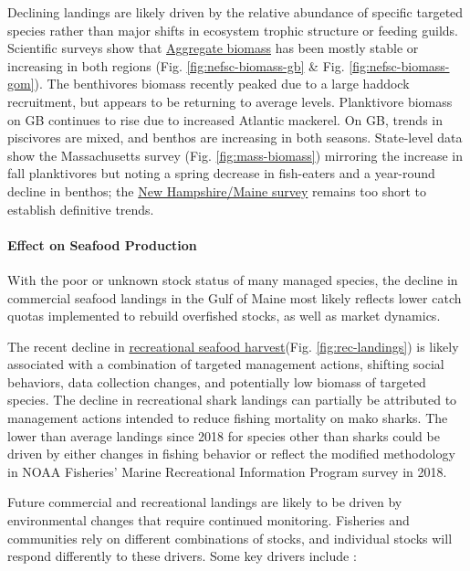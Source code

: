 \documentclass[
  10pt,
]{article}
\begin{document}
Declining landings are likely driven by the relative abundance of specific targeted species rather than major shifts in ecosystem trophic structure or feeding guilds. Scientific surveys show that \href{https://noaa-edab.github.io/catalog/aggregate_biomass.html}{Aggregate biomass} has been mostly stable or increasing in both regions (Fig. \ref{fig:nefsc-biomass-gb} \& Fig. \ref{fig:nefsc-biomass-gom}). The benthivores biomass recently peaked due to a large haddock recruitment, but appears to be returning to average levels. Planktivore biomass on GB continues to rise due to increased Atlantic mackerel. On GB, trends in piscivores are mixed, and benthos are increasing in both seasons. State-level data show the Massachusetts survey (Fig. \ref{fig:mass-biomass}) mirroring the increase in fall planktivores but noting a spring decrease in fish-eaters and a year-round decline in benthos; the \href{https://noaa-edab.github.io/catalog/mass_inshore_survey.html?q=survey\#mass_inshore_survey}{New Hampshire/Maine survey} remains too short to establish definitive trends.

\paragraph{Effect on Seafood Production}\label{effect-on-seafood-production}

With the poor or unknown stock status of many managed species, the decline in commercial seafood landings in the Gulf of Maine most likely reflects lower catch quotas implemented to rebuild overfished stocks, as well as market dynamics.

The recent decline in \href{https://noaa-edab.github.io/catalog/recdat.html}{recreational seafood harvest}(Fig. \ref{fig:rec-landings}) is likely associated with a combination of targeted management actions, shifting social behaviors, data collection changes, and potentially low biomass of targeted species. The decline in recreational shark landings can partially be attributed to management actions intended to reduce fishing mortality on mako sharks. The lower than average landings since 2018 for species other than sharks could be driven by either changes in fishing behavior or reflect the modified methodology in NOAA Fisheries' Marine Recreational Information Program survey in 2018.

Future commercial and recreational landings are likely to be driven by environmental changes that require continued monitoring. Fisheries and communities rely on different combinations of stocks, and individual stocks will respond differently to these drivers. Some key drivers include :
\end{document}
